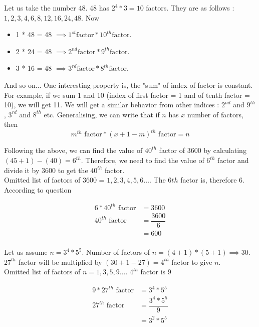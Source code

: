 \begin{EXTRA-LEARNING}
    Let us take the number 48. 48 has $2^4 * 3 = 10$ factors. They are as follows : $1,2,3,4,6,8,12,16,24,48$. Now 
    \begin{itemize}
        \item 1 * 48 = 48 $\implies 1^{st} \text{factor} * 10^{th} \text{factor}$. 
        \item 2 * 24 = 48 $\implies 2^{nd} \text{factor} * 9^{th} \text{factor}$. 
        \item 3 * 16 = 48 $\implies 3^{rd} \text{factor} * 8^{th} \text{factor}$. 
    \end{itemize}
    And so on... One interesting property is, the "sum" of index of factor is constant. For example, if we sum 1 and 10 (index of first factor = 1 and of tenth factor = 10), we will get 11. We will get a similar behavior from other indices : $2^{nd}$ and $9^{th}$, $3^{rd}$ and $8^{th}$ etc. Generalising, we can write that if $n$ has $x$ number of factors, then 
    $$
    m^{th} \text{ factor} * (x + 1 - m)^{th} \text{ factor} = n
    $$
\end{EXTRA-LEARNING}

Following the above, we can find the value of $40^{th}$ factor of 3600 by calculating $(45 + 1) - (40) = 6^{th}$. Therefore, we need to find the value of $6^{th}$ factor and divide it by 3600 to get the $40^{th}$ factor. \\

Omitted list of factors of 3600 = $1,2,3,4,5,6 \ldots$. The $6{th}$ factor is, therefore 6. According to question

\begin{align*}
    6 * 40^{th} \text{ factor} &= 3600 \\
    40^{th} \text{ factor} &= \dfrac{3600}{6} \\
    &= 600 \\
\end{align*}


Let us assume $n = 3^4 * 5^5$. Number of factors of $n = (4+1) * (5+1) \implies 30$. $27^{th}$ factor will be multiplied by $(30 + 1 - 27) = 4^{th}$ factor to give $n$. \\

Omitted list of factors of $n = 1,3,5,9 \ldots$. $4^{th}$ factor is 9

\begin{align*}
    9 * 27^{th} \text{ factor} &= 3^4 * 5^5 \\
    27^{th} \text{ factor} &= \dfrac{3^4 * 5^5}{9} \\
    &= 3^2 * 5^5 \\
\end{align*}

